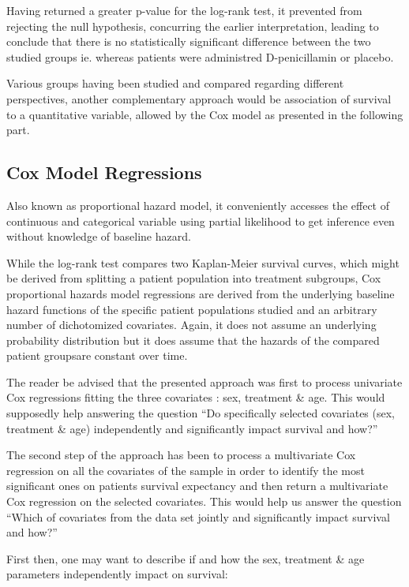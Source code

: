 \documentclass[]{article}
\begin{document}
Having returned a greater p-value for the log-rank test, it prevented
from rejecting the null hypothesis, concurring the earlier
interpretation, leading to conclude that there is no statistically
significant difference between the two studied groups ie. whereas
patients were administred D-penicillamin or placebo.

Various groups having been studied and compared regarding different
perspectives, another complementary approach would be association of
survival to a quantitative variable, allowed by the Cox model as
presented in the following part.

\subsection{Cox Model Regressions}\label{cox-model-regressions}

Also known as proportional hazard model, it conveniently accesses the
effect of continuous and categorical variable using partial likelihood
to get inference even without knowledge of baseline hazard.

While the log-rank test compares two Kaplan-Meier survival curves, which
might be derived from splitting a patient population into treatment
subgroups, Cox proportional hazards model regressions are derived from
the underlying baseline hazard functions of the specific patient
populations studied and an arbitrary number of dichotomized covariates.
Again, it does not assume an underlying probability distribution but it
does assume that the hazards of the compared patient groupsare constant
over time.

The reader be advised that the presented approach was first to process
univariate Cox regressions fitting the three covariates : sex, treatment
\& age. This would supposedly help answering the question ``Do
specifically selected covariates (sex, treatment \& age) independently
and significantly impact survival and how?''

The second step of the approach has been to process a multivariate Cox
regression on all the covariates of the sample in order to identify the
most significant ones on patients survival expectancy and then return a
multivariate Cox regression on the selected covariates. This would help
us answer the question ``Which of covariates from the data set jointly
and significantly impact survival and how?''

First then, one may want to describe if and how the sex, treatment \&
age parameters independently impact on survival:
\end{document}
